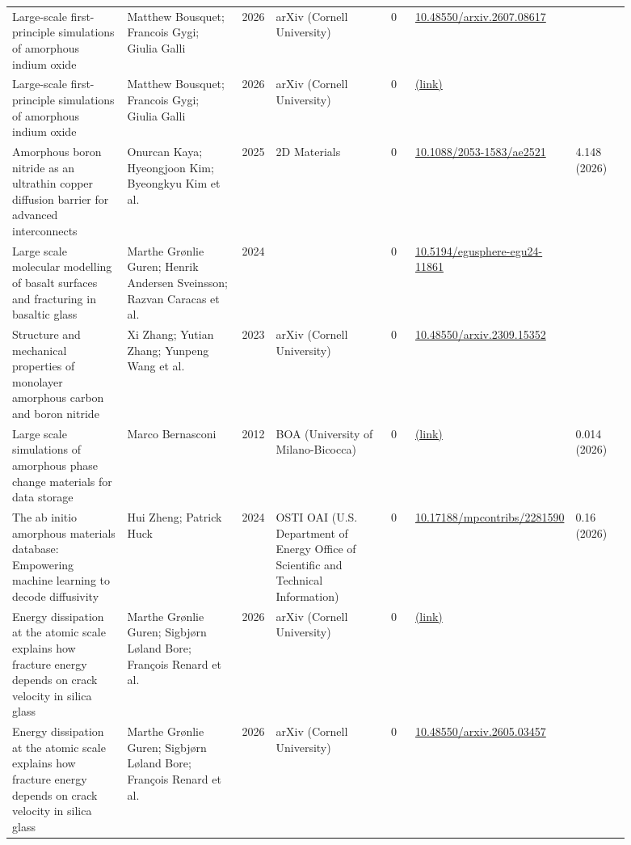 \documentclass[10pt,a4paper]{article}
\begin{document}
{\begin{longtable}{p{0.192\linewidth}p{0.192\linewidth}p{0.043\linewidth}p{0.192\linewidth}p{0.043\linewidth}p{0.132\linewidth}p{0.096\linewidth}}
Large-scale first-principle simulations of amorphous indium oxide & Matthew Bousquet; Francois Gygi; Giulia Galli & 2026 & arXiv (Cornell University) & 0 & \href{https://doi.org/10.48550/arxiv.2607.08617}{10.48550/arxiv.2607.08617} &  \\
Large-scale first-principle simulations of amorphous indium oxide & Matthew Bousquet; Francois Gygi; Giulia Galli & 2026 & arXiv (Cornell University) & 0 & \href{https://openalex.org/W7168054795}{(link)} &  \\
Amorphous boron nitride as an ultrathin copper diffusion barrier for advanced interconnects & Onurcan Kaya; Hyeongjoon Kim; Byeongkyu Kim et al. & 2025 & 2D Materials & 0 & \href{https://doi.org/10.1088/2053-1583/ae2521}{10.1088/2053-1583/ae2521} & 4.148 (2026) \\
Large scale molecular modelling of basalt surfaces and fracturing in basaltic glass & Marthe Grønlie Guren; Henrik Andersen Sveinsson; Razvan Caracas et al. & 2024 &  & 0 & \href{https://doi.org/10.5194/egusphere-egu24-11861}{10.5194/egusphere-egu24-11861} &  \\
Structure and mechanical properties of monolayer amorphous carbon and boron nitride & Xi Zhang; Yutian Zhang; Yunpeng Wang et al. & 2023 & arXiv (Cornell University) & 0 & \href{https://doi.org/10.48550/arxiv.2309.15352}{10.48550/arxiv.2309.15352} &  \\
Large scale simulations of amorphous phase change materials for data storage & Marco Bernasconi & 2012 & BOA (University of Milano-Bicocca) & 0 & \href{https://openalex.org/W1151744864}{(link)} & 0.014 (2026) \\
The ab initio amorphous materials database: Empowering machine learning to decode diffusivity & Hui Zheng; Patrick Huck & 2024 & OSTI OAI (U.S. Department of Energy Office of Scientific and Technical Information) & 0 & \href{https://doi.org/10.17188/mpcontribs/2281590}{10.17188/mpcontribs/2281590} & 0.16 (2026) \\
Energy dissipation at the atomic scale explains how fracture energy depends on crack velocity in silica glass & Marthe Grønlie Guren; Sigbjørn Løland Bore; François Renard et al. & 2026 & arXiv (Cornell University) & 0 & \href{https://openalex.org/W7160565694}{(link)} &  \\
Energy dissipation at the atomic scale explains how fracture energy depends on crack velocity in silica glass & Marthe Grønlie Guren; Sigbjørn Løland Bore; François Renard et al. & 2026 & arXiv (Cornell University) & 0 & \href{https://doi.org/10.48550/arxiv.2605.03457}{10.48550/arxiv.2605.03457} &  \\

\end{longtable}}
\end{document}

